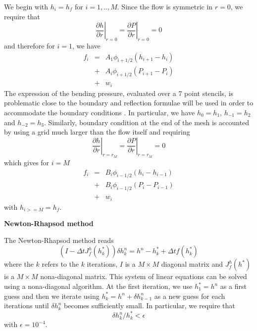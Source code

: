 We begin with  $h_i=h_f$ for $i=1,..,M$.  Since the  flow is symmetric
in $r=0$, we require that
\begin{equation}
  \left.\frac{\partial h}{\partial r}\right|_{r=0} =\left.\frac{\partial P}{\partial r}\right|_{r=0} =0
\end{equation}
and therefore for $i=1$, we have
\begin{eqnarray}
  f_i     &=&A_1\phi_{i+1/2}\left(h_{i+1}-h_i\right)\nonumber\\
          &+&A_i\phi_{i+1/2}\left(P_{i+1}-P_i\right)\nonumber\\
          &+&w_i\label{C4-Num-5}
\end{eqnarray}
The expression  of the  bending pressure, evaluated  over a  $7$ point
stencils, is problematic close to the boundary and reflection formulae
will  be  used  in  order   to  accommodate  the  boundary  conditions
\citet{Patankar:1980vu}.   In   particular,  we  have  $h_0   =  h_1$,
$h_{-1}=h_2$ and  $h_{-2}=h_3$.  Similarly, boundary condition  at the
end of the mesh is accounted by using a grid much larger than the flow
itself and requiring
\begin{equation}
  \left.\frac{\partial h}{\partial r}\right|_{r=r_M} =\left.\frac{\partial P}{\partial r}\right|_{r=r_M} =0
\end{equation}
which gives for $i=M$
\begin{eqnarray}
  f_i     &=&B_i\phi_{i-1/2}\left(h_{i}-h_{i-1}\right)\nonumber\\
          &+&B_i\phi_{i-1/2}\left(P_{i}-P_{i-1}\right)\nonumber\\
          &+&w_i\label{C4-Num-5}
\end{eqnarray}
with $h_{i>=M}=h_f$.


\vspace{.5cm} \textbf{Newton-Rhapsod method} \vspace{.5cm}

The Newton-Rhapsod method reads
\begin{equation}
  (I-\Delta tJ^h_{f}(h_k^*))\delta h_k^n=h^n-h_k^*+\Delta t f(h_k^*)
\end{equation}
where the  $k$ refers  to the $k$  iterations, $I$ is  a $M  \times M$
diagonal  matrix and  $J_f^h(h^*)$  is a  $M  \times M$  nona-diagonal
matrix.   This  system of  linear  equations  can  be solved  using  a
nona-diagonal algorithm. At the first  iteration, we use $h^*_1 = h^n$
as     a    first     guess    and     then    we     iterate    using
$h^*_k  = h^n+\delta  h_{k-1}^n$ as  a new  guess for  each iterations
until $\delta h^n_{k}$ becomes  sufficiently small.  In particular, we
require that
\begin{equation}
  \delta h^n_k/h^*_{k}<\epsilon
\end{equation}
with $\epsilon = 10^{-4}$.

